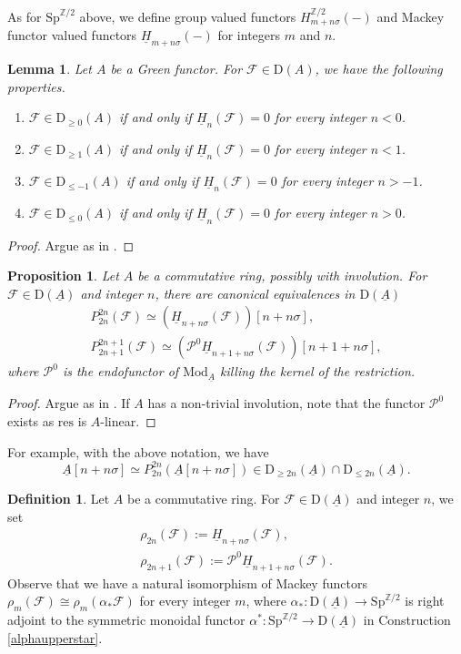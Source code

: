 \documentclass[10pt]{amsart}
\newtheorem{prop}[thm]{Proposition}
\newtheorem{lem}[thm]{Lemma}
\theoremstyle{definition}
\newtheorem{df}[thm]{Definition}
\numberwithin{equation}{section}
\newcommand{\Z}{\mathbb{Z}}
\newcommand{\cF}{\mathcal{F}}
\newcommand{\cP}{\mathcal{P}}
\newcommand{\rD}{\mathrm{D}}
\newcommand{\ul}{\underline}
\newcommand{\Mod}{\mathrm{Mod}}
\newcommand{\Sp}{\mathrm{Sp}}
\newcommand{\res}{\mathrm{res}}
\begin{document}
As for $\Sp^{\Z/2}$ above,
we define group valued functors $H^{\Z/2}_{m+n\sigma}(-)$ and Mackey functor valued functors $\ul{H}_{m+n\sigma}(-)$ for integers $m$ and $n$.

\begin{lem}
\label{abelian filtration}
Let $A$ be a Green functor.
For $\cF\in \rD(A)$,
we have the following properties.
\begin{enumerate}
\item[\textup{(1)}]
$\cF\in \rD_{\geq 0}(A)$ if and only if $\ul{H}_n(\cF)=0$ for every integer $n<0$.
\item[\textup{(2)}]
$\cF\in \rD_{\geq 1}(A)$ if and only if $\ul{H}_n(\cF)=0$ for every integer $n<1$.
\item[\textup{(3)}]
$\cF\in \rD_{\leq -1}(A)$ if and only if $\ul{H}_n(\cF)=0$ for every integer $n>-1$.
\item[\textup{(4)}]
$\cF\in \rD_{\leq 0}(A)$ if and only if $\ul{H}_n(\cF)=0$ for every integer $n>0$.
\end{enumerate}
\end{lem}
\begin{proof}
Argue as in \cite[Proposition 11.1.18]{HHR21}.
\end{proof}

\begin{prop}
\label{abelian slicesexplicit}
Let $A$ be a commutative ring, possibly with involution.
For $\cF\in \rD(\ul{A})$ and integer $n$,
there are canonical equivalences in $\rD(\ul{A})$
\begin{gather*}
P_{2n}^{2n}(\cF)
\simeq
(\ul{H}_{n+n\sigma}(\cF))[n+n\sigma],
\\
P_{2n+1}^{2n+1}(\cF)
\simeq
(\cP^0 \ul{H}_{n+1+n\sigma}(\cF))[n+1+n\sigma],
\end{gather*}
where $\cP^0$ is the endofunctor of $\Mod_{\ul{A}}$ killing the kernel of the restriction.
\end{prop}
\begin{proof}
Argue as in \cite[Theorem 17.5.25]{Hil20}.
If $A$ has a non-trivial involution, note that the functor $\cP^0$ exists as $\res$ is $A$-linear.
\end{proof}

For example, with the above notation,
we have
\begin{equation}
\label{b}
\ul{A}[n+n\sigma]
\simeq
P_{2n}^{2n}(\ul{A}[n+n\sigma])
\in \rD_{\geq 2n}(\ul{A})\cap \rD_{\leq 2n}(\ul{A}).
\end{equation}

\begin{df}
\label{rho definition}
Let $A$ be a commutative ring.
For $\cF\in \rD(\ul{A})$ and integer $n$,
we set
\begin{gather*}
\rho_{2n}(\cF)
:=
\ul{H}_{n+n\sigma}(\cF),
\\
\rho_{2n+1}(\cF)
:=
\cP^0 \ul{H}_{n+1+n\sigma}(\cF).
\end{gather*}
Observe that we have a natural isomorphism of Mackey functors $\rho_m(\cF)\cong \rho_m(\alpha_*\cF)$ for every integer $m$,
where $\alpha_*\colon \rD(\ul{A})\to \Sp^{\Z/2}$ is right adjoint to the symmetric monoidal functor $\alpha^*\colon \Sp^{\Z/2}\to \rD(\ul{A})$ in Construction \ref{alphaupperstar}.
\end{df}
\end{document}
